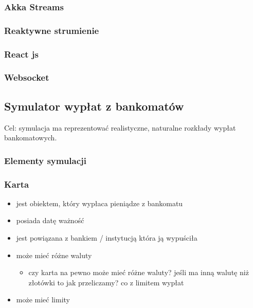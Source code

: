 \subsubsection{Akka Streams}\label{akka-streams}

\subsubsection{Reaktywne strumienie}\label{reaktywne-strumienie}

\subsubsection{React js}\label{react-js}

\subsubsection{Websocket}\label{websocket}

\subsection{Symulator wypłat z bankomatów}\label{symulator-wypux142at-z-bankomatuxf3w}

Cel: symulacja ma reprezentować realistyczne, naturalne rozkłady wypłat bankomatowych.

\subsubsection{Elementy symulacji}\label{elementy-symulacji}

\subsubsection{Karta}\label{karta}

\begin{itemize}
\tightlist
\item
  jest obiektem, który wypłaca pieniądze z bankomatu
\item
  posiada datę ważność
\item
  jest powiązana z bankiem / instytucją która ją wypuściła
\item
  może mieć różne waluty

  \begin{itemize}
  \tightlist
  \item
    czy karta na pewno może mieć różne waluty? jeśli ma inną walutę niż złotówki to jak przeliczamy? co z limitem wypłat
  \end{itemize}
\item
  może mieć limity
\end{itemize}

